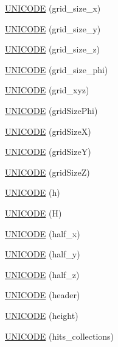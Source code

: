 \begin{DoxyCompactItemize}
\hyperlink{namespace_d_d4hep_1_1_x_m_l_a01c980ae57b695952e6fc7c8e4db18af}{U\+N\+I\+C\+O\+DE} (grid\+\_\+size\+\_\+x)
\item 
\hyperlink{namespace_d_d4hep_1_1_x_m_l_a6d8f14edad61b6483f48a7db1400658b}{U\+N\+I\+C\+O\+DE} (grid\+\_\+size\+\_\+y)
\item 
\hyperlink{namespace_d_d4hep_1_1_x_m_l_a793789c9c6ec55782f2d1ee7d80422fb}{U\+N\+I\+C\+O\+DE} (grid\+\_\+size\+\_\+z)
\item 
\hyperlink{namespace_d_d4hep_1_1_x_m_l_ab3272b02facd035f55618a408197f97e}{U\+N\+I\+C\+O\+DE} (grid\+\_\+size\+\_\+phi)
\item 
\hyperlink{namespace_d_d4hep_1_1_x_m_l_a203e9791b2f513afbe5f25a2654256d1}{U\+N\+I\+C\+O\+DE} (grid\+\_\+xyz)
\item 
\hyperlink{namespace_d_d4hep_1_1_x_m_l_a17c2e56b6965d67107f701b2c3773a2e}{U\+N\+I\+C\+O\+DE} (grid\+Size\+Phi)
\item 
\hyperlink{namespace_d_d4hep_1_1_x_m_l_ac1c4ea3e1529768e7e4b95ad9c4beb98}{U\+N\+I\+C\+O\+DE} (grid\+SizeX)
\item 
\hyperlink{namespace_d_d4hep_1_1_x_m_l_a75b499a1ec97574e7cfebd2dd740e45a}{U\+N\+I\+C\+O\+DE} (grid\+SizeY)
\item 
\hyperlink{namespace_d_d4hep_1_1_x_m_l_af77ccf51a8d1562d65f7b916444d136a}{U\+N\+I\+C\+O\+DE} (grid\+SizeZ)
\item 
\hyperlink{namespace_d_d4hep_1_1_x_m_l_abdfaaf089190f3abd1b049ac9edf14b0}{U\+N\+I\+C\+O\+DE} (h)
\item 
\hyperlink{namespace_d_d4hep_1_1_x_m_l_a77611e1b5cf440c48d4699749ba0f372}{U\+N\+I\+C\+O\+DE} (H)
\item 
\hyperlink{namespace_d_d4hep_1_1_x_m_l_aa79768b8ff1df8558c6d9728337c1e36}{U\+N\+I\+C\+O\+DE} (half\+\_\+x)
\item 
\hyperlink{namespace_d_d4hep_1_1_x_m_l_a2728b29b5e4ad608ec11792200fda807}{U\+N\+I\+C\+O\+DE} (half\+\_\+y)
\item 
\hyperlink{namespace_d_d4hep_1_1_x_m_l_ab8cb70c629eb5f794f4e1b3c31643643}{U\+N\+I\+C\+O\+DE} (half\+\_\+z)
\item 
\hyperlink{namespace_d_d4hep_1_1_x_m_l_a098579678467a09894ca436519f81c97}{U\+N\+I\+C\+O\+DE} (header)
\item 
\hyperlink{namespace_d_d4hep_1_1_x_m_l_a4331dcd20a75c31b41359497a1fd57f9}{U\+N\+I\+C\+O\+DE} (height)
\item 
\hyperlink{namespace_d_d4hep_1_1_x_m_l_a00b478450a6109ec8fc8c6bebb335397}{U\+N\+I\+C\+O\+DE} (hits\+\_\+collections)
\item 

\end{DoxyCompactItemize}

